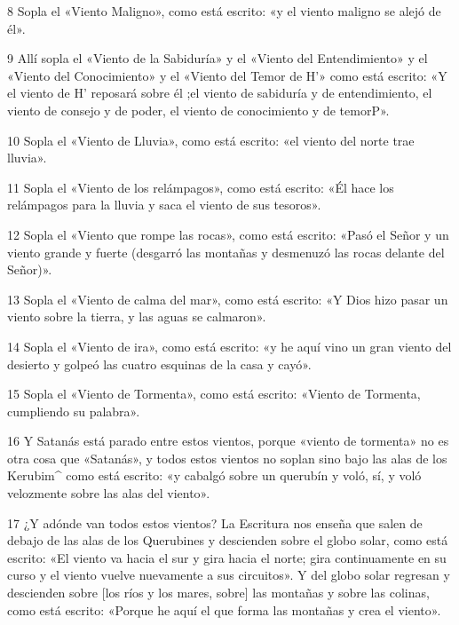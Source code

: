 \par 8 Sopla el «Viento Maligno», como está escrito: «y el viento maligno se alejó de él».

\par 9 Allí sopla el «Viento de la Sabiduría» y el «Viento del Entendimiento» y el «Viento del Conocimiento» y el «Viento del Temor de H'» como está escrito: «Y el viento de H' reposará sobre él ;el viento de sabiduría y de entendimiento, el viento de consejo y de poder, el viento de conocimiento y de temorP».

\par 10 Sopla el «Viento de Lluvia», como está escrito: «el viento del norte trae lluvia».

\par 11 Sopla el «Viento de los relámpagos», como está escrito: «Él hace los relámpagos para la lluvia y saca el viento de sus tesoros».

\par 12 Sopla el «Viento que rompe las rocas», como está escrito: «Pasó el Señor y un viento grande y fuerte (desgarró las montañas y desmenuzó las rocas delante del Señor)».

\par 13 Sopla el «Viento de calma del mar», como está escrito: «Y Dios hizo pasar un viento sobre la tierra, y las aguas se calmaron».

\par 14 Sopla el «Viento de ira», como está escrito: «y he aquí vino un gran viento del desierto y golpeó las cuatro esquinas de la casa y cayó».

\par 15 Sopla el «Viento de Tormenta», como está escrito: «Viento de Tormenta, cumpliendo su palabra».

\par 16 Y Satanás está parado entre estos vientos, porque «viento de tormenta» no es otra cosa que «Satanás», y todos estos vientos no soplan sino bajo las alas de los Kerubim^ como está escrito: «y cabalgó sobre un querubín y voló, sí, y voló velozmente sobre las alas del viento».

\par 17 ¿Y adónde van todos estos vientos? La Escritura nos enseña que salen de debajo de las alas de los Querubines y descienden sobre el globo solar, como está escrito: «El viento va hacia el sur y gira hacia el norte; gira continuamente en su curso y el viento vuelve nuevamente a sus circuitos». Y del globo solar regresan y descienden sobre [los ríos y los mares, sobre] las montañas y sobre las colinas, como está escrito: «Porque he aquí el que forma las montañas y crea el viento».

